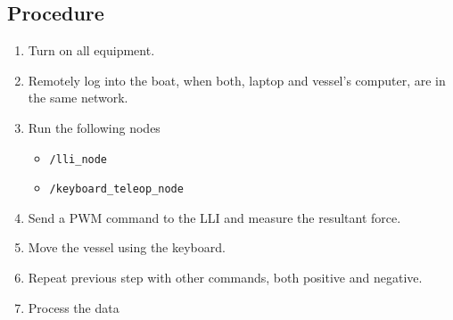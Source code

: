 \subsection*{Procedure}
\begin{enumerate}
	\item Turn on all equipment.
    \item Remotely log into the boat, when both, laptop and vessel's computer, are in the same network.
	\item Run the following nodes
		\begin{itemize}
			\item \lstinline[style=cinline]{/lli_node}
			\item \lstinline[style=cinline]{/keyboard_teleop_node}
		\end{itemize}
    \item Send a PWM command to the LLI and measure the resultant force.
	\item Move the vessel using the keyboard.
    \item Repeat previous step with other commands, both positive and negative.
    \item Process the data
\end{enumerate}


